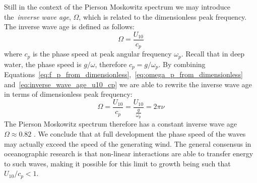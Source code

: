 Still in the context of the Pierson Moskowitz spectrum  we may introduce
the~\emph{inverse wave age}, $\Omega$, which is related to the dimensionless
peak frequency. The inverse wave age is defined as follows:
\begin{equation}
\label{eq:inverse_wave_age_u10_cp}
 \Omega = \frac{U_{10}}{c_p}
\end{equation}
where $c_p$ is the phase speed at peak angular frequency $\omega_p$. Recall 
that in deep water, the phase speed is $g/\omega$, therefore $c_p = g/\omega_p$.
By combining 
Equations~\ref{eq:f_p_from_dimensionless},~\ref{eq:omega_p_from_dimensionless} 
and~\ref{eq:inverse_wave_age_u10_cp} we are able to rewrite the inverse wave 
age in terms of dimensionless peak frequency:
\begin{equation}
 \Omega = \frac{U_{10}}{c_p} = \frac{U_{10}}{\frac{g}{\omega_p}} = 2\pi\nu
\end{equation}
The Pierson Moskowitz spectrum therefore has a constant inverse wave age $\Omega
\approx 0.82$ . We conclude that at full development the phase speed of the
waves may actually exceed the speed of the generating wind. The general
consensus in oceanographic research is that non-linear interactions are able to
transfer energy to such waves, making it possible for this limit to growth being
such that $U_{10}/c_p < 1$.
%
